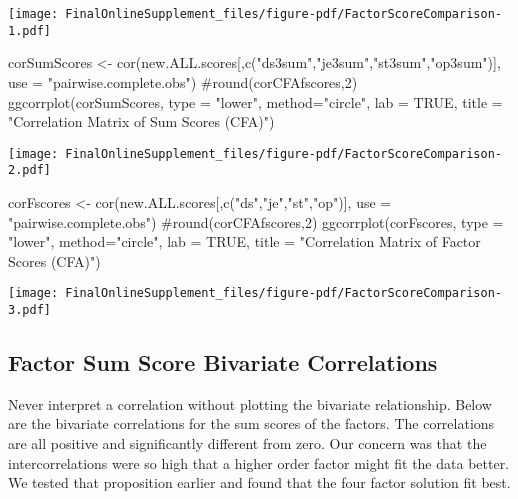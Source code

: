\documentclass[
  letterpaper,
  DIV=11,
  numbers=noendperiod]{scrartcl}
\newenvironment{Shaded}{\begin{snugshade}}{\end{snugshade}}
\newcommand{\AttributeTok}[1]{\textcolor[rgb]{0.40,0.45,0.13}{#1}}
\newcommand{\CommentTok}[1]{\textcolor[rgb]{0.37,0.37,0.37}{#1}}
\newcommand{\ConstantTok}[1]{\textcolor[rgb]{0.56,0.35,0.01}{#1}}
\newcommand{\FunctionTok}[1]{\textcolor[rgb]{0.28,0.35,0.67}{#1}}
\newcommand{\NormalTok}[1]{\textcolor[rgb]{0.00,0.23,0.31}{#1}}
\newcommand{\OtherTok}[1]{\textcolor[rgb]{0.00,0.23,0.31}{#1}}
\newcommand{\StringTok}[1]{\textcolor[rgb]{0.13,0.47,0.30}{#1}}
\begin{document}
\texttt{[image: FinalOnlineSupplement\_files/figure-pdf/FactorScoreComparison-1.pdf]}

\begin{Shaded}
\begin{Highlighting}[]
\NormalTok{corSumScores }\OtherTok{\textless{}{-}} \FunctionTok{cor}\NormalTok{(new.ALL.scores[,}\FunctionTok{c}\NormalTok{(}\StringTok{"ds3sum"}\NormalTok{,}\StringTok{"je3sum"}\NormalTok{,}\StringTok{"st3sum"}\NormalTok{,}\StringTok{"op3sum"}\NormalTok{)], }\AttributeTok{use =} \StringTok{"pairwise.complete.obs"}\NormalTok{)}
\CommentTok{\#round(corCFAfscores,2)}
\FunctionTok{ggcorrplot}\NormalTok{(corSumScores, }\AttributeTok{type =} \StringTok{"lower"}\NormalTok{, }\AttributeTok{method=}\StringTok{"circle"}\NormalTok{, }\AttributeTok{lab =} \ConstantTok{TRUE}\NormalTok{, }\AttributeTok{title =} \StringTok{"Correlation Matrix of Sum Scores (CFA)"}\NormalTok{)}
\end{Highlighting}
\end{Shaded}

\texttt{[image: FinalOnlineSupplement\_files/figure-pdf/FactorScoreComparison-2.pdf]}

\begin{Shaded}
\begin{Highlighting}[]
\NormalTok{corFscores }\OtherTok{\textless{}{-}} \FunctionTok{cor}\NormalTok{(new.ALL.scores[,}\FunctionTok{c}\NormalTok{(}\StringTok{"ds"}\NormalTok{,}\StringTok{"je"}\NormalTok{,}\StringTok{"st"}\NormalTok{,}\StringTok{"op"}\NormalTok{)], }\AttributeTok{use =} \StringTok{"pairwise.complete.obs"}\NormalTok{)}
\CommentTok{\#round(corCFAfscores,2)}
\FunctionTok{ggcorrplot}\NormalTok{(corFscores, }\AttributeTok{type =} \StringTok{"lower"}\NormalTok{, }\AttributeTok{method=}\StringTok{"circle"}\NormalTok{, }\AttributeTok{lab =} \ConstantTok{TRUE}\NormalTok{, }\AttributeTok{title =} \StringTok{"Correlation Matrix of Factor Scores (CFA)"}\NormalTok{)}
\end{Highlighting}
\end{Shaded}

\texttt{[image: FinalOnlineSupplement\_files/figure-pdf/FactorScoreComparison-3.pdf]}

\subsection{Factor Sum Score Bivariate
Correlations}\label{factor-sum-score-bivariate-correlations}

Never interpret a correlation without plotting the bivariate
relationship. Below are the bivariate correlations for the sum scores of
the factors. The correlations are all positive and significantly
different from zero. Our concern was that the intercorrelations were so
high that a higher order factor might fit the data better. We tested
that proposition earlier and found that the four factor solution fit
best.
\end{document}
